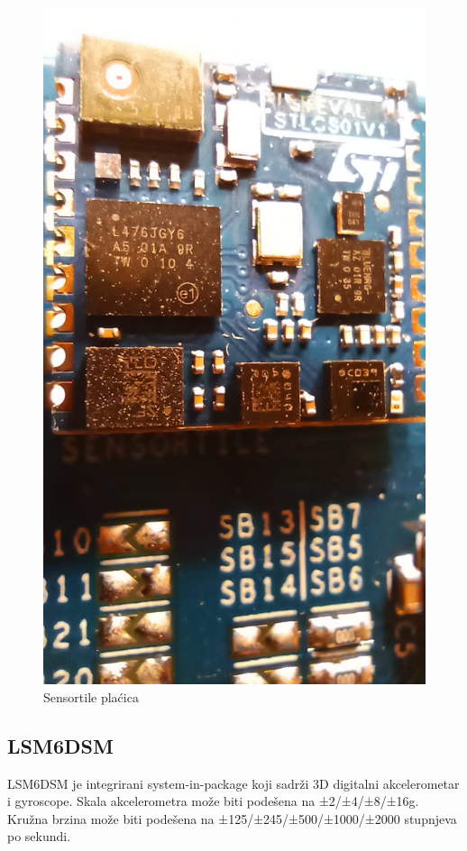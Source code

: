 \documentclass[times, utf8, diplomski]{diplomski}
\begin{document}
\begin{figure}[H]
\includegraphics[scale=0.14]{tile_close.jpeg}
\centering
\caption{Sensortile plaćica}
\end{figure}

\subsection{LSM6DSM}
LSM6DSM \cite{LSM6DSM} je integrirani system-in-package koji sadrži 3D digitalni akcelerometar i gyroscope. Skala akcelerometra može biti podešena na ±2/±4/±8/±16g. Kružna brzina može biti podešena na
±125/±245/±500/±1000/±2000 stupnjeva po sekundi.
\end{document}
